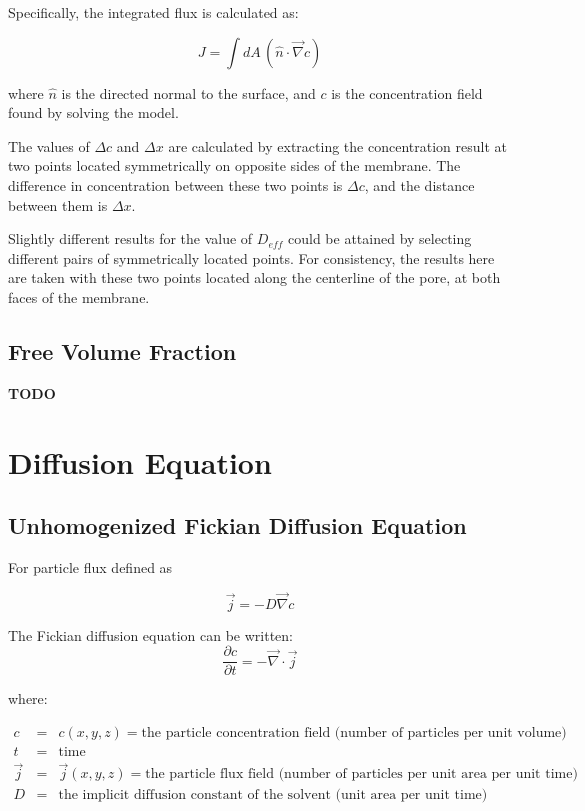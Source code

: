 \documentclass{article}
\begin{document}
Specifically, the integrated flux is calculated as:

$$J = \int dA\, \left(\hat{n} \cdot \vec{\nabla} c \right)$$

where $\hat{n}$ is the directed normal to the surface,
and $c$ is the concentration field found by solving the model.

The values of $\Delta c$ and $\Delta x$ are calculated by extracting
the concentration result at two points located symmetrically on opposite sides of the membrane.
The difference in concentration between these two points is $\Delta c$,
and the distance between them is $\Delta x$.

Slightly different results for the value of $D_{eff}$ could be attained by selecting different
pairs of symmetrically located points.
For consistency, the results here are taken with these two points located
along the centerline of the pore, at both faces of the membrane.

\subsection{Free Volume Fraction}\label{subsec:volfrac}

\textbf{TODO}

\section{Diffusion Equation}\label{sec:equation}

\subsection{Unhomogenized Fickian Diffusion Equation}\label{subsec:unhom_fick}

For particle flux defined as 

$$\vec{j} = - D \vec{\nabla} c$$

The Fickian diffusion equation can be written:
$$\frac{\partial c}{\partial t} = - \vec{\nabla} \cdot \vec{j}$$

where:

$\begin{array}{rcl}
c & = & c(x,y,z) = \text{the particle concentration field (number of particles per unit volume)} \\
t & = & \text{time} \\
\vec{j} & = & \vec{j}(x,y,z) = \text{the particle flux field (number of particles per unit area per unit time)} \\
D & = & \text{the implicit diffusion constant of the solvent (unit area per unit time)}
\end{array}$
\end{document}
